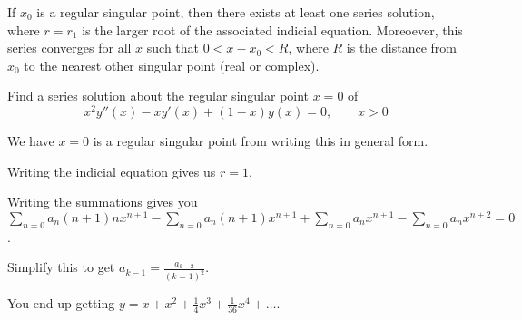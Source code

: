 \documentclass[../diffeq.tex]{subfiles}
\begin{document}
\begin{theorem}
    If $x_0$ is a regular singular point, then there exists at least one series solution, where $r=r_1$ is the larger root of the associated indicial equation. Moreoever, this series converges for all $x$ such that 
    $0<x-x_0<R$, where $R$ is the distance from $x_0$ to the nearest other singular point (real or complex).
\end{theorem}

\begin{example}
    Find a series solution about the regular singular point $x=0$ of 
    \[ x^2y''(x)-xy'(x)+(1-x)y(x)=0, \qquad x>0 \]

    We have $x=0$ is a regular singular point from writing this in general form.

    Writing the indicial equation gives us $r=1$.

    Writing the summations gives you $\sum_{n=0}a_n(n+1)nx^{n+1}-\sum_{n=0}a_n(n+1)x^{n+1}+\sum_{n=0}a_n x^{n+1}-\sum_{n=0}a_n x^{n+2}=0$.

    Simplify this to get $a_{k-1}=\frac{a_{k-2}}{(k=1)^2}$.

    You end up getting $y=x+x^2+\frac{1}{4}x^3+\frac{1}{36}x^4+\dots$.
\end{example}
\end{document}
